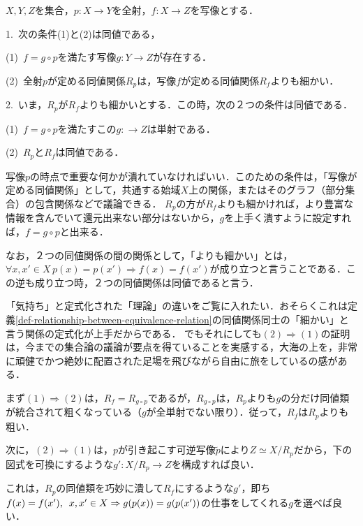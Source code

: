\documentclass[uplatex, 12pt, dvipdfmx]{jsreport}
\begin{document}
\begin{proposition}[全射と一般の写像]\label{prop-induced-mapping}\rm{}
    $X,Y,Z$を集合，$p:X\to Y$を全射，$f:X\to Z$を写像とする．

    1.\, 次の条件(1)と(2)は同値である，

    (1)\, $f=g\circ p$を満たす写像$g:Y\to Z$が存在する．
    \begin{center}\end{center}

    (2)\, 全射$p$が定める同値関係$R_p$は，写像$f$が定める同値関係$R_f$よりも細かい．

    2.\, いま，$R_p$が$R_f$よりも細かいとする．この時，次の２つの条件は同値である．

    (1)\, $f=g\circ p$を満たすこの$g:\to Z$は単射である．

    (2)\, $R_p$と$R_f$は同値である．
\end{proposition}
\begin{remark}
    写像$p$の時点で重要な何かが潰れていなければいい．このための条件は，「写像が定める同値関係」として，共通する始域$X$上の関係，またはそのグラフ（部分集合）の包含関係などで議論できる．
    $R_p$の方が$R_f$よりも細かければ，より豊富な情報を含んでいて還元出来ない部分はないから，$g$を上手く潰すように設定すれば，$f=g\circ p$と出来る．

    なお，２つの同値関係の間の関係として，「よりも細かい」とは，$\forall x,x'\in X \, p(x)=p(x')\Rightarrow f(x)=f(x')$が成り立つと言うことである．この逆も成り立つ時，２つの同値関係は同値であると言う．
\end{remark}
「気持ち」と定式化された「理論」の違いをご覧に入れたい．おそらくこれは定義\ref{def-relationship-between-equivalence-relation}の同値関係同士の「細かい」と言う関係の定式化が上手だからである．
でもそれにしても$(2)\Rightarrow (1)$の証明は，今までの集合論の議論が要点を得ていることを実感する，大海の上を，非常に頑健でかつ絶妙に配置された足場を飛びながら自由に旅をしているの感がある．

まず$(1)\Rightarrow (2)$は，$R_f=R_{g\circ p}$であるが，$R_{g\circ p}$は，$R_p$よりも$g$の分だけ同値類が統合されて粗くなっている（$g$が全単射でない限り）．従って，$R_f$は$R_p$よりも粗い．

次に，$(2)\Rightarrow (1)$は，$p$が引き起こす可逆写像$\tilde{p}$により$Z\simeq X/R_p$だから，下の図式を可換にするような$g':X/R_p\to Z$を構成すれば良い．
\begin{center}\end{center}
これは，$R_p$の同値類を巧妙に潰して$R_f$にするような$g'$，即ち$f(x)=f(x'),\hspace{0.5em} x,x'\in X \Rightarrow g(p(x))=g(p(x'))$の仕事をしてくれる$g$を選べば良い．
\end{document}
